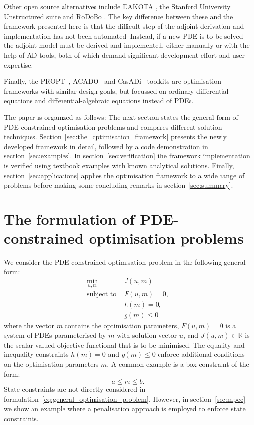 \documentclass[prodmode,acmtoms]{acmsmall}
\begin{document}
Other open source alternatives include DAKOTA \cite{eldred1996}, the Stanford University Unstructured suite \cite{palacios2012} and RoDoBo \cite{becker2005}.
The key difference between these and the framework presented here is that the difficult step of the adjoint derivation and implementation has not been automated. 
Instead, if a new PDE is to be solved the adjoint model must be derived and implemented, either manually or with the help of AD tools,
both of which demand significant development effort and user expertise.

Finally, the PROPT~\cite{propt}, ACADO~\cite{houska2011} and CasADi~\cite{andersson2012} toolkits are optimisation frameworks with similar design goals, but focussed on ordinary differential equations and differential-algebraic equations instead of PDEs.

The paper is organized as follows: 
The next section states the general form of PDE-constrained optimisation problems and compares different solution techniques.
Section~\ref{sec:the_optimisation_framework} presents the newly developed framework in detail, followed by a code demonstration in section~\ref{sec:examples}.
In section~\ref{sec:verification} the framework implementation is verified using textbook examples with known analytical solutions. 
Finally, section~\ref{sec:applications} applies the optimisation framework to a wide range of problems before making some concluding remarks in section~\ref{sec:summary}. 

\section{The formulation of PDE-constrained optimisation problems}\label{sec:optpde_problem_formulation}

We consider the PDE-constrained optimisation problem in the following general form:
\begin{equation}
\begin{aligned}
 \min_{ u,  m}~&J( u,  m) \\ 
 \textrm{subject to }  
& F(u, m)  = 0, \\
& h( m)  = 0, \\ 
& g( m)  \le 0, 
\end{aligned}\label{eq:general_optimisation_problem}
\end{equation} where the vector $m$ contains the optimisation parameters,
$F( u,  m) = 0$ is a system of PDEs parameterised by $m$ with solution vector $u$, and
$J( u,  m) \in \mathbb{R}$ is the scalar-valued objective functional that is to be minimised.
The equality and inequality constraints $h(m) = 0 $ and $g(m) \le 0 $ enforce additional conditions  on the optimisation parameters $m$.
A common example is a box constraint of the form:
\begin{equation*}
   a \le  m \le  b.
\end{equation*}
State constraints are not directly considered in formulation~\eqref{eq:general_optimisation_problem}. 
However, in section~\ref{sec:mpec} we show an example where a penalisation approach is employed to enforce state constraints.
\end{document}
